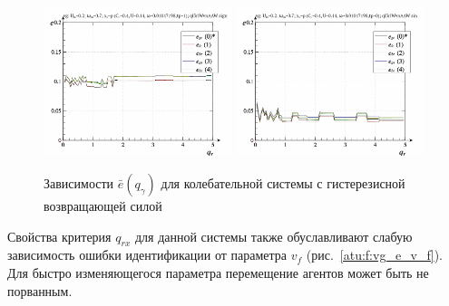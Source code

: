 \begin{figure}[ht!]
\begin{center}
  \includegraphics[width=0.49\textwidth]{p/cha/vg/vg_id-p_q_gamma_sign.png}
  \hfill
  \includegraphics[width=0.49\textwidth]{p/cha/vg/vg_id-p_q_gamma_sin.png}
\end{center}
  \caption{Зависимости $\bar{e}(q_\gamma)$ для колебательной системы с гистерезисной возвращающей силой}
\label{atu:f:vg_e_q_gamma}
\end{figure}

Свойства критерия $q_{rx}$ для данной системы
также обуславливают слабую зависимость ошибки идентификации
от параметра $v_f$ (рис.~\ref{atu:f:vg_e_v_f}).
Для быстро изменяющегося параметра перемещение агентов
может быть не порванным.


